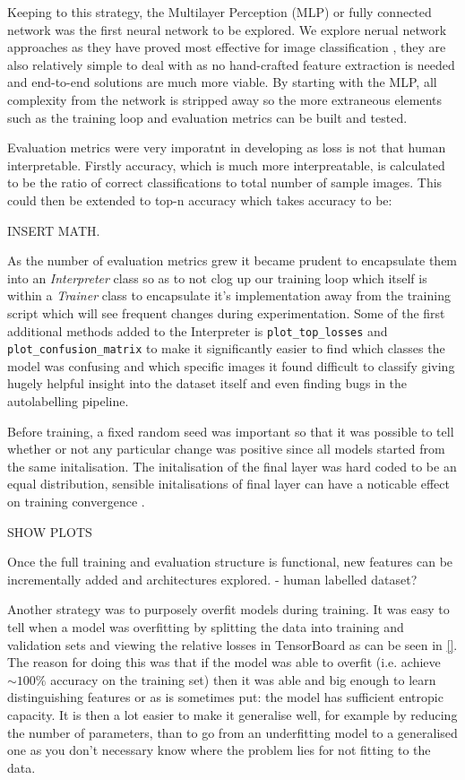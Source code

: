 Keeping to this strategy, the Multilayer Perception (MLP) or fully connected network \cite{} was the first neural network to be explored.
We explore nerual network approaches as they have proved most effective for image classification \cite{}, they are also relatively simple to deal
with as no hand-crafted feature extraction is needed and end-to-end solutions are much more viable.
By starting with the MLP, all complexity from the network is stripped away so the more extraneous elements such as the training loop and 
evaluation metrics can be built and tested.

Evaluation metrics were very imporatnt in developing as loss is not that human interpretable.  Firstly accuracy, which is much more interpreatable, 
is calculated to be the ratio of correct classifications to total number of sample images.  This could then be extended to top-n accuracy which 
takes accuracy to be:  

INSERT MATH.

As the number of evaluation metrics grew it became prudent to encapsulate them into an \textit{Interpreter} class so as to not clog up our 
training loop which itself is within a \textit{Trainer} class to encapsulate it's implementation away from the training script which will 
see frequent changes during experimentation.  Some of the first additional methods added to the Interpreter is \verb|plot_top_losses| and
\verb|plot_confusion_matrix| to make it significantly easier to find which classes the model was confusing and which specific images it 
found difficult to classify giving hugely helpful insight into the dataset itself and even finding bugs in the autolabelling pipeline.

Before training, a fixed random seed was important so that it was possible to tell whether or not any particular change was positive since all models started
from the same initalisation.  The initalisation of the final layer was hard coded to be an equal distribution, sensible initalisations of final layer can have 
a noticable effect on training convergence \cite{}.

SHOW PLOTS

Once the full training and evaluation structure is functional, new features can be incrementally added and architectures explored.
 - human labelled dataset?

Another strategy was to purposely overfit models during training.  It was easy to tell when a model was overfitting by splitting the data into
training and validation sets \cite{} and viewing the relative losses in TensorBoard as can be seen in \autoref{}.  The reason for doing this
was that if the model was able to overfit (i.e. achieve $\sim100\%$ accuracy on the training set) then it was able and big enough to learn distinguishing features or
as is sometimes put: the model has sufficient entropic capacity.  It is then a lot easier to make it generalise well, for example by reducing the number of parameters, 
than to go from an underfitting model to a generalised one as you don't necessary know where the problem lies for not fitting to the data.

